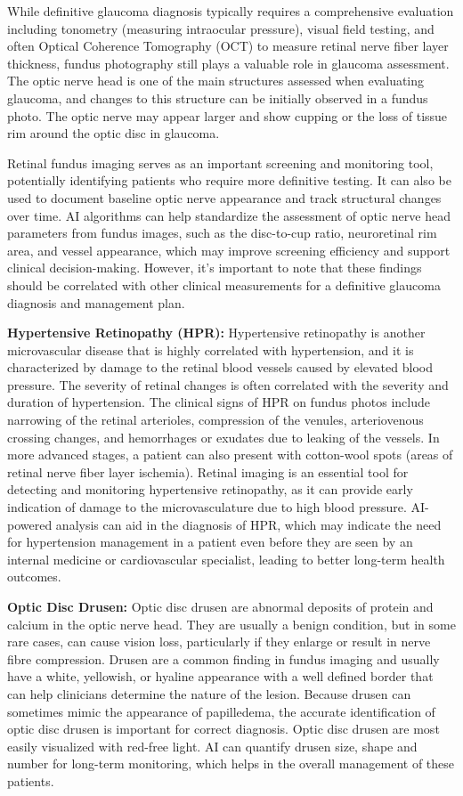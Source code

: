 \documentclass[
  Letterpaper,
]{scrbook}
\begin{document}
While definitive glaucoma diagnosis typically requires a comprehensive
evaluation including tonometry (measuring intraocular pressure), visual
field testing, and often Optical Coherence Tomography (OCT) to measure
retinal nerve fiber layer thickness, fundus photography still plays a
valuable role in glaucoma assessment. The optic nerve head is one of the
main structures assessed when evaluating glaucoma, and changes to this
structure can be initially observed in a fundus photo. The optic nerve
may appear larger and show cupping or the loss of tissue rim around the
optic disc in glaucoma.

Retinal fundus imaging serves as an important screening and monitoring
tool, potentially identifying patients who require more definitive
testing. It can also be used to document baseline optic nerve appearance
and track structural changes over time. AI algorithms can help
standardize the assessment of optic nerve head parameters from fundus
images, such as the disc-to-cup ratio, neuroretinal rim area, and vessel
appearance, which may improve screening efficiency and support clinical
decision-making. However, it's important to note that these findings
should be correlated with other clinical measurements for a definitive
glaucoma diagnosis and management plan.

\textbf{Hypertensive Retinopathy (HPR):} Hypertensive retinopathy is
another microvascular disease that is highly correlated with
hypertension, and it is characterized by damage to the retinal blood
vessels caused by elevated blood pressure. The severity of retinal
changes is often correlated with the severity and duration of
hypertension. The clinical signs of HPR on fundus photos include
narrowing of the retinal arterioles, compression of the venules,
arteriovenous crossing changes, and hemorrhages or exudates due to
leaking of the vessels. In more advanced stages, a patient can also
present with cotton-wool spots (areas of retinal nerve fiber layer
ischemia). Retinal imaging is an essential tool for detecting and
monitoring hypertensive retinopathy, as it can provide early indication
of damage to the microvasculature due to high blood pressure. AI-powered
analysis can aid in the diagnosis of HPR, which may indicate the need
for hypertension management in a patient even before they are seen by an
internal medicine or cardiovascular specialist, leading to better
long-term health outcomes.

\textbf{Optic Disc Drusen:} Optic disc drusen are abnormal deposits of
protein and calcium in the optic nerve head. They are usually a benign
condition, but in some rare cases, can cause vision loss, particularly
if they enlarge or result in nerve fibre compression. Drusen are a
common finding in fundus imaging and usually have a white, yellowish, or
hyaline appearance with a well defined border that can help clinicians
determine the nature of the lesion. Because drusen can sometimes mimic
the appearance of papilledema, the accurate identification of optic disc
drusen is important for correct diagnosis. Optic disc drusen are most
easily visualized with red-free light. AI can quantify drusen size,
shape and number for long-term monitoring, which helps in the overall
management of these patients.
\end{document}
